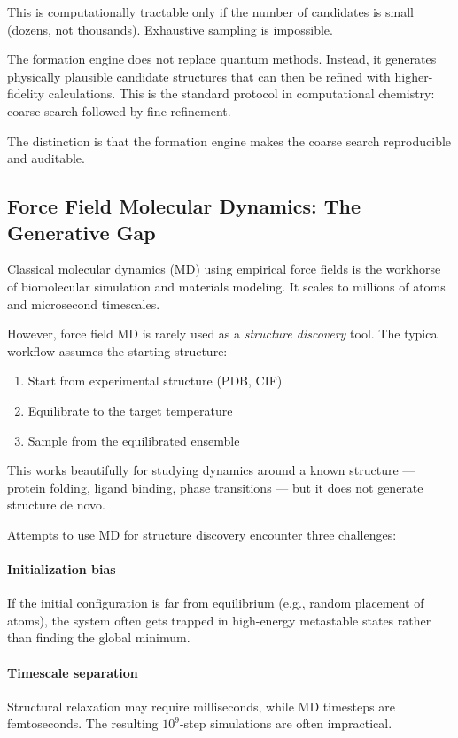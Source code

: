 \documentclass[11pt]{article}
\begin{document}
This is computationally tractable only if the number of candidates is small (dozens, not thousands). Exhaustive sampling is impossible.

The formation engine does not replace quantum methods. Instead, it generates physically plausible candidate structures that can then be refined with higher-fidelity calculations. This is the standard protocol in computational chemistry: coarse search followed by fine refinement.

The distinction is that the formation engine makes the coarse search reproducible and auditable.

\subsection{Force Field Molecular Dynamics: The Generative Gap}

Classical molecular dynamics (MD) using empirical force fields is the workhorse of biomolecular simulation and materials modeling. It scales to millions of atoms and microsecond timescales.

However, force field MD is rarely used as a \textit{structure discovery} tool. The typical workflow assumes the starting structure:

\begin{enumerate}
\item Start from experimental structure (PDB, CIF)
\item Equilibrate to the target temperature
\item Sample from the equilibrated ensemble
\end{enumerate}

This works beautifully for studying dynamics around a known structure — protein folding, ligand binding, phase transitions — but it does not generate structure de novo.

Attempts to use MD for structure discovery encounter three challenges:

\paragraph{Initialization bias} If the initial configuration is far from equilibrium (e.g., random placement of atoms), the system often gets trapped in high-energy metastable states rather than finding the global minimum.

\paragraph{Timescale separation} Structural relaxation may require milliseconds, while MD timesteps are femtoseconds. The resulting $10^9$-step simulations are often impractical.
\end{document}
